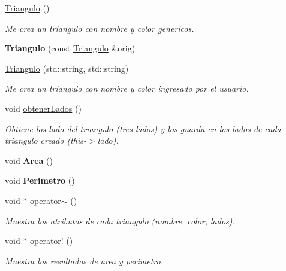 \begin{DoxyCompactItemize}
\item 
\hyperlink{class_triangulo_a905d421bd19655a979ccad9e2998db0c}{Triangulo} ()\hypertarget{class_triangulo_a905d421bd19655a979ccad9e2998db0c}{}\label{class_triangulo_a905d421bd19655a979ccad9e2998db0c}

\begin{DoxyCompactList}\small\item\em Me crea un triangulo con nombre y color genericos. \end{DoxyCompactList}\item 
{\bfseries Triangulo} (const \hyperlink{class_triangulo}{Triangulo} \&orig)\hypertarget{class_triangulo_a1a7267ad3feb850a9718002420fc2fd8}{}\label{class_triangulo_a1a7267ad3feb850a9718002420fc2fd8}

\item 
\hyperlink{class_triangulo_aa56f00477a32f8c6465b2b7256fdd7d0}{Triangulo} (std\+::string, std\+::string)
\begin{DoxyCompactList}\small\item\em Me crea un triangulo con nombre y color ingresado por el usuario. \end{DoxyCompactList}\item 
void \hyperlink{class_triangulo_a1174be9286bedca30ef95806c52bdc2d}{obtener\+Lados} ()\hypertarget{class_triangulo_a1174be9286bedca30ef95806c52bdc2d}{}\label{class_triangulo_a1174be9286bedca30ef95806c52bdc2d}

\begin{DoxyCompactList}\small\item\em Obtiene los lado del triangulo (tres lados) y los guarda en los lados de cada triangulo creado (this-\/$>$lado). \end{DoxyCompactList}\item 
void {\bfseries Area} ()\hypertarget{class_triangulo_aa8d4fae608682df1bcac3b68982a86e6}{}\label{class_triangulo_aa8d4fae608682df1bcac3b68982a86e6}

\item 
void {\bfseries Perimetro} ()\hypertarget{class_triangulo_a02c05bf39e881390e7bc9bf3d6f1b680}{}\label{class_triangulo_a02c05bf39e881390e7bc9bf3d6f1b680}

\item 
void $\ast$ \hyperlink{class_triangulo_a7a8a19fd43cb3181e672b004b4ce83d5}{operator$\sim$} ()
\begin{DoxyCompactList}\small\item\em Muestra los atributos de cada triangulo (nombre, color, lados). \end{DoxyCompactList}\item 
void $\ast$ \hyperlink{class_triangulo_ab234082ba67e5dd0636b05e24884c470}{operator!} ()
\begin{DoxyCompactList}\small\item\em Muestra los resultados de area y perimetro. \end{DoxyCompactList}\end{DoxyCompactItemize}

